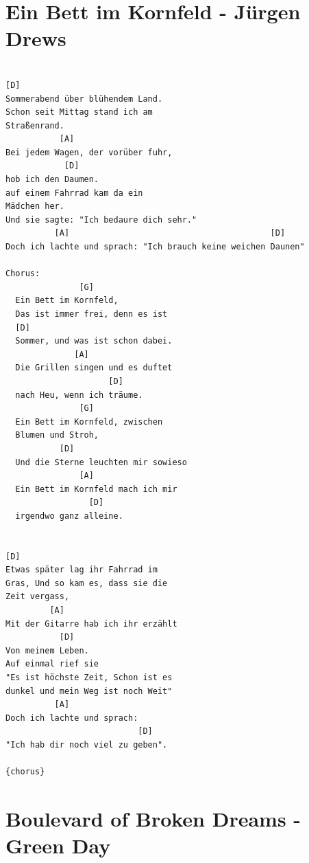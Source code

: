 \documentclass[
]{book}
\let\stdsection\section
\renewcommand\section{\clearpage\stdsection}
\begin{document}
\hypertarget{ein-bett-im-kornfeld---juxfcrgen-drews}{%
\section{Ein Bett im Kornfeld - Jürgen Drews}\label{ein-bett-im-kornfeld---juxfcrgen-drews}}

\begin{verbatim}

[D]
Sommerabend über blühendem Land.
Schon seit Mittag stand ich am 
Straßenrand.
           [A]
Bei jedem Wagen, der vorüber fuhr,
            [D]
hob ich den Daumen.
auf einem Fahrrad kam da ein 
Mädchen her.
Und sie sagte: "Ich bedaure dich sehr."
          [A]                                         [D]
Doch ich lachte und sprach: "Ich brauch keine weichen Daunen"

Chorus:
               [G]
  Ein Bett im Kornfeld,
  Das ist immer frei, denn es ist
  [D]
  Sommer, und was ist schon dabei.
              [A]
  Die Grillen singen und es duftet 
                     [D]
  nach Heu, wenn ich träume.
               [G]
  Ein Bett im Kornfeld, zwischen 
  Blumen und Stroh,
           [D]
  Und die Sterne leuchten mir sowieso
               [A]
  Ein Bett im Kornfeld mach ich mir 
                 [D]
  irgendwo ganz alleine.
  

[D]
Etwas später lag ihr Fahrrad im 
Gras, Und so kam es, dass sie die 
Zeit vergass,
         [A]
Mit der Gitarre hab ich ihr erzählt
           [D]
Von meinem Leben.
Auf einmal rief sie
"Es ist höchste Zeit, Schon ist es 
dunkel und mein Weg ist noch Weit"
          [A]
Doch ich lachte und sprach:
                           [D]
"Ich hab dir noch viel zu geben".

{chorus}

\end{verbatim}

\hypertarget{boulevard-of-broken-dreams---green-day}{%
\section{Boulevard of Broken Dreams - Green Day}\label{boulevard-of-broken-dreams---green-day}}
\end{document}
